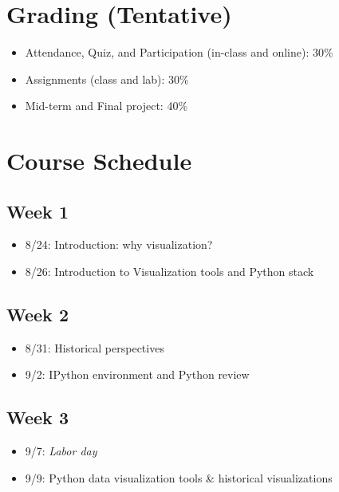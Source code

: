 \documentclass[11pt,article,oneside]{memoir}
\begin{document}
\section{Grading (Tentative)}
\label{sec:grading_tentative_}

\begin{itemize}

\item Attendance, Quiz, and Participation (in-class and online): 30\%

\item Assignments (class and lab): 30\%

\item Mid-term and Final project: 40\%


\end{itemize}

\section{Course Schedule}

\subsection{Week 1}

\vspace{-5pt}
\begin{itemize}
\itemsep=-5pt
\item 8/24: Introduction: why visualization?
\item 8/26: Introduction to Visualization tools and Python stack 
\end{itemize}

\subsection{Week 2}
\vspace{-5pt}
\begin{itemize}
\itemsep=-5pt
\item 8/31: Historical perspectives
\item 9/2: IPython environment and Python review
\end{itemize}

\subsection{Week 3}
\vspace{-5pt}
\begin{itemize}
\itemsep=-5pt
\item 9/7: \emph{Labor day}
\item 9/9: Python data visualization tools \& historical visualizations
\end{itemize}
\end{document}
